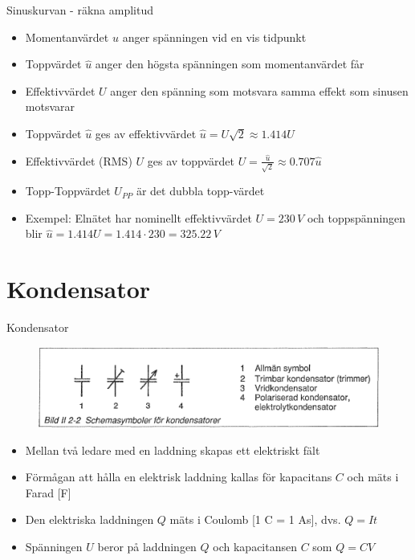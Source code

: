 \documentclass{beamer}
\begin{document}
\begin{frame}{Sinuskurvan - räkna amplitud}
  \begin{itemize}
  \item Momentanvärdet $u$ anger spänningen vid en vis tidpunkt
  \item Toppvärdet $\hat{u}$ anger den högsta spänningen som momentanvärdet får
  \item Effektivvärdet $U$ anger den spänning som motsvara samma effekt som sinusen motsvarar
  \item Toppvärdet $\hat{u}$ ges av effektivvärdet $\hat{u} = U\sqrt{2} \approx 1.414 U$
  \item Effektivvärdet (RMS) $U$ ges av toppvärdet $U = \frac{\hat{u}}{\sqrt{2}} \approx 0.707 \hat{u}$
  \item Topp-Toppvärdet $U_{PP}$ är det dubbla topp-värdet
  \item Exempel: Elnätet har nominellt effektivvärdet $U=230\,V$ och toppspänningen blir $\hat{u} = 1.414U = 1.414\cdot230 = 325.22\,V$
  \end{itemize}
\end{frame}

\section{Kondensator}

\begin{frame}{Kondensator}

\begin{figure}[h]
\includegraphics[width=\textwidth]{images/bild_2_2-02}
\end{figure}

\begin{itemize}
  \item Mellan två ledare med en laddning skapas ett elektriskt fält
  \item Förmågan att hålla en elektrisk laddning kallas för kapacitans $C$ och mäts i Farad [F]
  \item Den elektriska laddningen $Q$ mäts i Coulomb [1 C = 1 As], dvs. $Q=It$
  \item Spänningen $U$ beror på laddningen $Q$ och kapacitansen $C$ som $Q=CV$
\end{itemize}
\end{frame}
\end{document}
